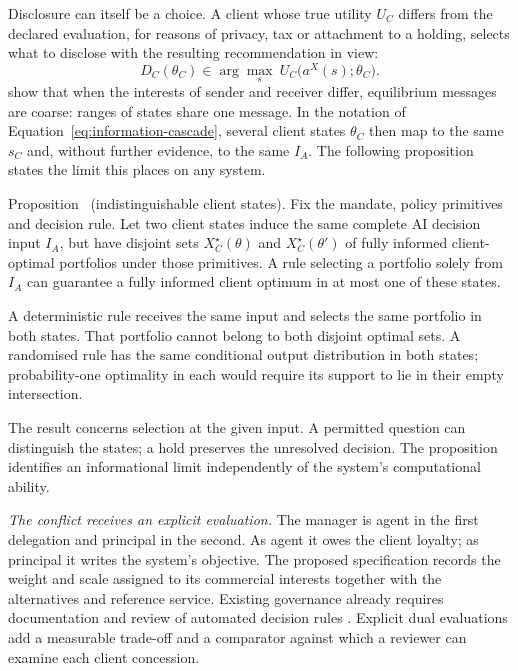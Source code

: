 \documentclass[oneside,10pt,english]{swissi}
\begin{document}
Disclosure can itself be a choice. A client whose true utility $U_C$ differs from the declared evaluation, for reasons of privacy, tax or attachment to a holding, selects what to disclose with the resulting recommendation in view:
\begin{equation}
 D_C(\theta_C)\in\arg\max_{s}\ U_C\bigl(a^X(s);\theta_C\bigr).
 \label{eq:strategic-disclosure}
\end{equation}
\textcite{crawford1982strategic} show that when the interests of sender and receiver differ, equilibrium messages are coarse: ranges of states share one message. In the notation of Equation~\eqref{eq:information-cascade}, several client states $\theta_C$ then map to the same $s_C$ and, without further evidence, to the same $I_A$. The following proposition states the limit this places on any system.

\begin{samepage}
\label{prop:indistinguishability}
Proposition~\thetheorem{} (indistinguishable client states). Fix the mandate, policy primitives and decision rule. Let two client states induce the same complete AI decision input $I_A$, but have disjoint sets $X_C^\star(\theta)$ and $X_C^\star(\theta')$ of fully informed client-optimal portfolios under those primitives. A rule selecting a portfolio solely from $I_A$ can guarantee a fully informed client optimum in at most one of these states.

\nopagebreak[4]
A deterministic rule receives the same input and selects the same portfolio in both states. That portfolio cannot belong to both disjoint optimal sets. A randomised rule has the same conditional output distribution in both states; probability-one optimality in each would require its support to lie in their empty intersection.
\par
\end{samepage}

The result concerns selection at the given input. A permitted question can distinguish the states; a hold preserves the unresolved decision. The proposition identifies an informational limit independently of the system's computational ability.

\emph{The conflict receives an explicit evaluation.} The manager is agent in the first delegation and principal in the second. As agent it owes the client loyalty; as principal it writes the system's objective. The proposed specification records the weight and scale assigned to its commercial interests together with the alternatives and reference service. Existing governance already requires documentation and review of automated decision rules \parencite[para.~90]{esma2022suitability}. Explicit dual evaluations add a measurable trade-off and a comparator against which a reviewer can examine each client concession.
\end{document}
